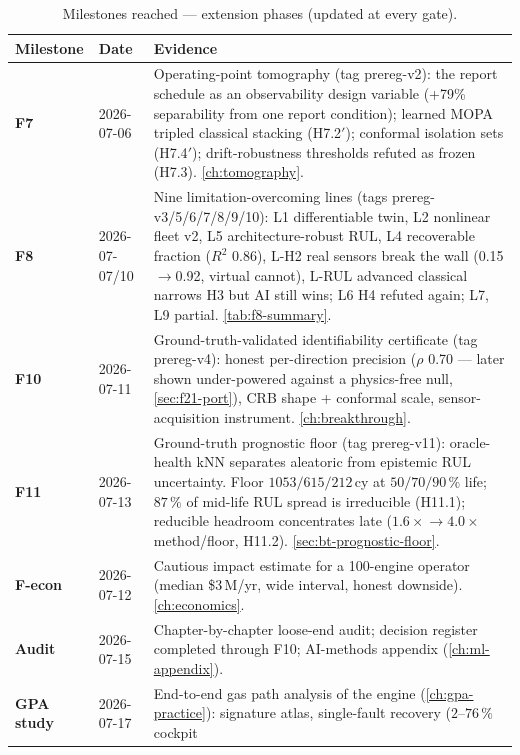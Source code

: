 \begin{table}[htbp]
  \centering\small
  \caption{Milestones reached --- extension phases (updated at every gate).}
  \label{tab:milestone-log-ext}
  \begin{tabular}{lp{}p{}}
    \toprule
    Milestone & Date & Evidence \\
    \midrule
    \textbf{F7} & 2026-07-06 & Operating-point tomography (tag prereg-v2): the
      report schedule as an observability design variable (+79\% separability from one report
      condition); learned MOPA tripled classical stacking (H7.2$'$); conformal isolation sets
      (H7.4$'$); drift-robustness thresholds refuted as frozen (H7.3). \cref{ch:tomography}. \\
    \textbf{F8} & 2026-07-07/10 & Nine limitation-overcoming lines (tags prereg-v3/5/6/7/8/9/10):
      L1 differentiable twin, L2 nonlinear fleet v2, L5 architecture-robust RUL, L4 recoverable
      fraction ($R^2$ 0.86), L-H2 real sensors break the wall (0.15$\to$0.92, virtual cannot),
      L-RUL advanced classical narrows H3 but AI still wins; L6 H4 refuted again; L7, L9
      partial. \cref{tab:f8-summary}. \\
    \textbf{F10} & 2026-07-11 & Ground-truth-validated identifiability certificate
      (tag prereg-v4): honest per-direction precision ($\rho$ 0.70 --- later shown
      under-powered against a physics-free null, \cref{sec:f21-port}), CRB shape + conformal
      scale, sensor-acquisition instrument. \cref{ch:breakthrough}. \\
    \textbf{F11} & 2026-07-13 & Ground-truth prognostic floor (tag prereg-v11): oracle-health
      kNN separates aleatoric from epistemic RUL uncertainty. Floor $1053/615/212$\,cy at
      $50/70/90\,\%$ life; $87\,\%$ of mid-life RUL spread is irreducible (H11.1); reducible
      headroom concentrates late ($1.6\times\!\to\!4.0\times$ method/floor, H11.2).
      \cref{sec:bt-prognostic-floor}. \\
    \textbf{F-econ} & 2026-07-12 & Cautious impact estimate for a 100-engine operator
      (median \$3\,M/yr, wide interval, honest downside). \cref{ch:economics}. \\
    \textbf{Audit} & 2026-07-15 & Chapter-by-chapter loose-end audit; decision
      register completed through F10; AI-methods appendix (\cref{ch:ml-appendix}). \\
    \textbf{GPA study} & 2026-07-17 & End-to-end gas path analysis of the engine
      (\cref{ch:gpa-practice}): signature atlas, single-fault recovery ($2$--$76\,\%$ cockpit

\end{tabular}
\end{table}

